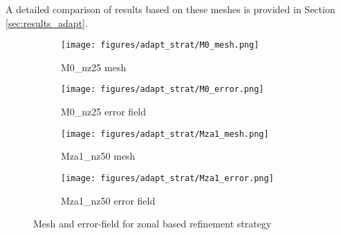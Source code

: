 A detailed comparison of results based on these meshes is provided in Section \ref{sec:results_adapt}.

\begin{figure}[H]
\centering
\begin{subfigure}[b]{0.475\textwidth}
\centering
\texttt{[image: figures/adapt\_strat/M0\_mesh.png]}
\caption{M0\_nz25 mesh}
\label{fig:M0_mesh}
\end{subfigure}
\begin{subfigure}[b]{0.475\textwidth}
\centering
\texttt{[image: figures/adapt\_strat/M0\_error.png]}
\caption{M0\_nz25 error field}
\label{fig:M0_err_plot}
\end{subfigure}
\begin{subfigure}[b]{0.475\textwidth}
\centering
\texttt{[image: figures/adapt\_strat/Mza1\_mesh.png]}
\caption{Mza1\_nz50 mesh}
\label{fig:Mza1_mesh}
\end{subfigure}
\begin{subfigure}[b]{0.475\textwidth}
\centering
\texttt{[image: figures/adapt\_strat/Mza1\_error.png]}
\caption{Mza1\_nz50 error field}
\label{fig:Mza1_err_plot}
\end{subfigure}
\caption{Mesh and error-field for zonal based refinement strategy}
\end{figure}

